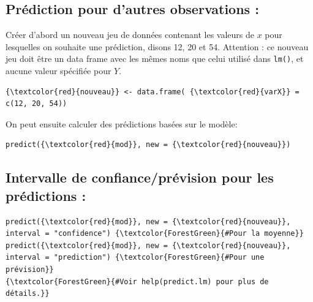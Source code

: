 \documentclass[letter, 11pt]{article}
\begin{document}
\subsection*{Prédiction pour d’autres observations :}

Créer d'abord un nouveau jeu de données contenant les valeurs de $x$ pour lesquelles on souhaite une prédiction, disons 12,  20 et 54. Attention : ce nouveau jeu doit être un data frame avec les mêmes noms que celui utilisé dans \texttt{lm()}, et aucune valeur spécifiée pour $Y$.
\begin{Verbatim}[commandchars=\\\{\}]
{\textcolor{red}{nouveau}} <- data.frame( {\textcolor{red}{varX}} = c(12, 20, 54))
\end{Verbatim}
On peut ensuite calculer des prédictions basées sur le modèle: 
\begin{Verbatim}
predict({\textcolor{red}{mod}}, new = {\textcolor{red}{nouveau}})
\end{Verbatim}


\subsection*{Intervalle de confiance/prévision pour les prédictions :
}
\begin{Verbatim}
predict({\textcolor{red}{mod}}, new = {\textcolor{red}{nouveau}}, interval = "confidence") {\textcolor{ForestGreen}{#Pour la moyenne}}
predict({\textcolor{red}{mod}}, new = {\textcolor{red}{nouveau}}, interval = "prediction") {\textcolor{ForestGreen}{#Pour une prévision}}
{\textcolor{ForestGreen}{#Voir help(predict.lm) pour plus de détails.}}
\end{Verbatim}
\end{document}
